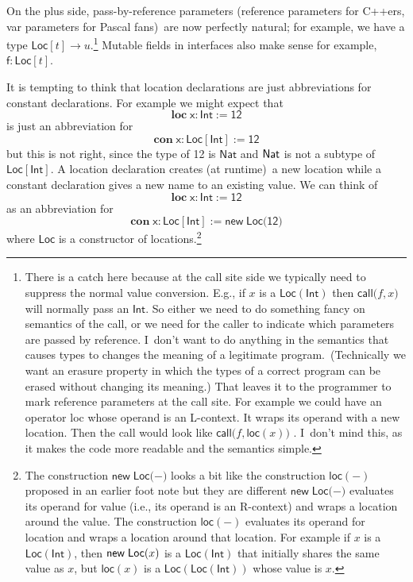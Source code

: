 \documentclass[12pt]{article}
\begin{document}
On the plus side, pass-by-reference parameters (reference parameters for
C++ers, var parameters for Pascal fans)\ are now perfectly natural; for
example, we have a type $\mathsf{Loc}[t]\rightarrow u$.\footnote{%
There is a catch here because at the call site side we typically need to
suppress the normal value conversion. E.g., if $x$ is a $\mathsf{Loc(Int)}$
then $\mathsf{call(}f,x\mathsf{)}$ will normally pass an $\mathsf{Int}$. So
either we need to do something fancy on semantics of the call, or we need
for the caller to indicate which parameters are passed by reference. I\
don't want to do anything in the semantics that causes types to changes the
meaning of a legitimate program.\ (Technically we want an erasure property
in which the types of a correct program can be erased without changing its
meaning.) That leaves it to the programmer to mark reference parameters at
the call site. For example we could have an operator \textsf{loc} whose
operand is an L-context. It wraps its operand with a new location. Then the
call would look like $\mathsf{call(}f,\mathsf{loc}\left( x\right) \mathsf{)}$%
. I\ don't mind this, as it makes the code more readable and the semantics
simple.} Mutable fields in interfaces also make sense for example, $\mathsf{f%
}\colon \mathsf{Loc}[t]$.

It is tempting to think that location declarations are just abbreviations
for constant declarations. For example we might expect that%
\begin{equation*}
\mathbf{loc}\;\mathsf{x}:\mathsf{Int:=12}
\end{equation*}%
is just an abbreviation for%
\begin{equation*}
\mathbf{con}\;\mathsf{x}:\mathsf{Loc}[\mathsf{Int}]:=\mathsf{12}
\end{equation*}%
but this is not right, since the type of 12 is $\mathsf{Nat}$ and $\mathsf{%
Nat}$ is not a subtype of $\mathsf{Loc}[\mathsf{Int}]$. A location
declaration creates (at runtime)\  a new location while a constant
declaration gives a new name to an existing value. We can think of%
\begin{equation*}
\mathbf{loc}\;\mathsf{x}:\mathsf{Int:=12}
\end{equation*}%
as an abbreviation for%
\begin{equation*}
\mathbf{con}\;\mathsf{x}:\mathsf{Loc}[\mathsf{Int}]:=\mathsf{new\;Loc}(%
\mathsf{12)}
\end{equation*}%
where $\mathsf{Loc}$ is a constructor of locations.\footnote{%
The construction $\mathsf{new\;Loc}(\mathsf{-)}$ looks a bit like the
construction $\mathsf{loc}\left( \mathsf{-}\right) $ proposed in an earlier
foot note but they are different $\mathsf{new\;Loc}(\mathsf{-)}$ evaluates
its operand for value (i.e., its operand is an R-context) and wraps a
location around the value. The construction $\mathsf{loc}\left( \mathsf{-}%
\right) $ evaluates its operand for location and wraps a location around
that location. For example if $x$ is a $\mathsf{Loc(Int)}$, then $\mathsf{%
new\;Loc}(x\mathsf{)}$ is a $\mathsf{Loc(Int)}$ that initially shares the
same value as $x$, but $\mathsf{loc}\left( x\right) $ is a $\mathsf{Loc}%
\left( \mathsf{Loc(Int)}\right) $ whose value is $x$.}
\end{document}
